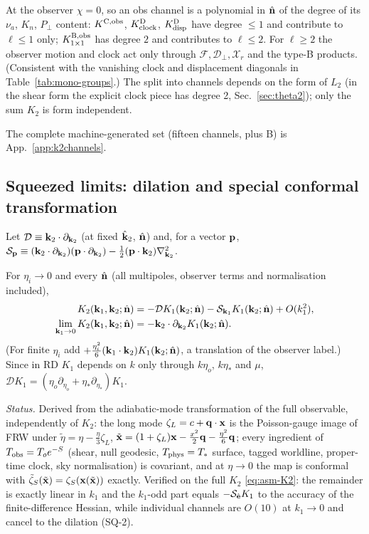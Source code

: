 \begin{remark}\label{rem:asm-obs}
At the observer $\chi=0$, so an obs channel is a polynomial in $\hat{\mathbf n}$ of the degree of its $\nu_a$, $K_n$, $P_\perp$ content:
$K^{\rm C,obs}$, $K^{\rm D}_{\rm clock}$, $K^{\rm D}_{\rm disp}$ have degree $\le1$ and contribute to $\ell\le1$ only;
$K^{\rm B,obs}_{1\times1}$ has degree $2$ and contributes to $\ell\le2$.  For $\ell\ge2$ the observer motion and clock act only through
$\mathcal F,\mathcal D_\perp,\mathcal X_r$ and the type-B products.  (Consistent with the vanishing clock and displacement diagonals in
Table~\ref{tab:mono-groups}.)  The split into channels depends on the form of $L_2$ (in the shear form the explicit clock piece has degree 2,
Sec.~\ref{sec:theta2}); only the sum $K_2$ is form independent.
\end{remark}
The complete machine-generated set (fifteen channels, plus B) is App.~\ref{app:k2channels}.

\subsection{Squeezed limits: dilation and special conformal transformation}
\label{sec:asm-squeezed}
Let $\mathcal D\equiv\mathbf k_2\cdot\partial_{\mathbf k_2}$ (at fixed $\hat{\mathbf k}_2$, $\hat{\mathbf n}$) and, for a vector $\mathbf p$,
$\mathcal S_{\mathbf p}\equiv(\mathbf k_2\cdot\partial_{\mathbf k_2})(\mathbf p\cdot\partial_{\mathbf k_2})-\tfrac12(\mathbf p\cdot\mathbf k_2)\nabla^2_{\mathbf k_2}$.
\begin{theorem}\label{thm:asm-squeezed}
For $\eta_i\to0$ and every $\hat{\mathbf n}$ (all multipoles, observer terms and normalisation included),
\begin{align}
K_2(\mathbf k_1,\mathbf k_2;\hat{\mathbf n})&=-\mathcal D K_1(\mathbf k_2;\hat{\mathbf n})-\mathcal S_{\mathbf k_1}K_1(\mathbf k_2;\hat{\mathbf n})+O(k_1^2),\nonumber\\
\lim_{\mathbf k_1\to0}K_2(\mathbf k_1,\mathbf k_2;\hat{\mathbf n})&=-\mathbf k_2\cdot\partial_{\mathbf k_2}K_1(\mathbf k_2;\hat{\mathbf n}).
\label{eq:asm-squeezed}
\end{align}
(For finite $\eta_i$ add $+\tfrac{\eta_i^2}6(\mathbf k_1\cdot\mathbf k_2)K_1(\mathbf k_2;\hat{\mathbf n})$, a translation of the observer label.)  Since in RD
$K_1$ depends on $k$ only through $k\eta_o$, $k\eta_*$ and $\mu$, $\mathcal DK_1=(\eta_o\partial_{\eta_o}+\eta_*\partial_{\eta_*})K_1$.
\end{theorem}
\noindent\emph{Status.}  Derived from the adiabatic-mode transformation of the full observable, independently of
$K_2$: the long mode $\zeta_L=c+\mathbf q\cdot\mathbf x$ is the Poisson-gauge image of FRW under
$\tilde\eta=\eta-\tfrac\eta3\zeta_L$, $\tilde{\mathbf x}=(1+\zeta_L)\mathbf x-\tfrac{x^2}2\mathbf q-\tfrac{\eta^2}6\mathbf q$; every ingredient of $T_{\rm obs}=T_oe^{-S}$
(shear, null geodesic, $T_{\rm phys}=T_*$ surface, tagged worldline, proper-time clock, sky normalisation) is covariant, and at
$\eta\to0$ the map is conformal with $\tilde\zeta_S(\tilde{\mathbf x})=\zeta_S(\mathbf x(\tilde{\mathbf x}))$ exactly.  Verified on the full $K_2$
\eqref{eq:asm-K2}: the remainder is exactly linear in $k_1$ and the $k_1$-odd part equals $-\mathcal S_{\hat{\mathbf e}}K_1$ to the accuracy of the finite-difference
Hessian, while individual channels are $O(10)$ at $k_1\to0$ and cancel to the dilation (SQ-2).

